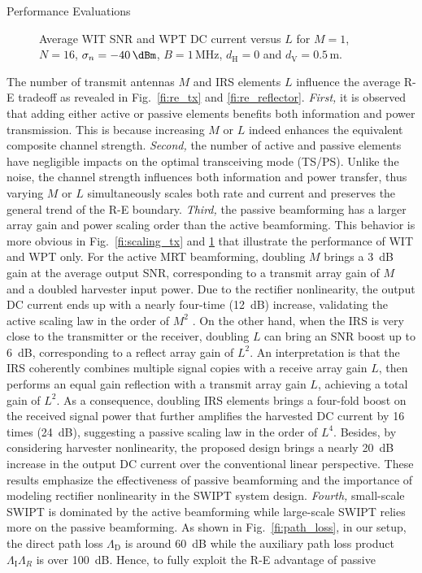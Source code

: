 \documentclass[journal]{IEEEtran}
\begin{document}
\begin{section}{Performance Evaluations}
		\begin{figure}[!t]
			\centering
			\begin{adjustbox}{width=0.9\columnwidth}
				
			\end{adjustbox}
			\caption{Average WIT SNR and WPT DC current versus $L$ for $M=1$, $N=16$, $\sigma_n=-40\,\si{\dBm}$, $B=1\,\si{\MHz}$, $d_{\mathrm{H}}=0$ and $d_{\mathrm{V}}=0.5\,\si{\meter}$.}
			\label{fi:scaling_reflector}
		\end{figure}

		The number of transmit antennas $M$ and IRS elements $L$ influence the average R-E tradeoff as revealed in Fig.~\ref{fi:re_tx} and \ref{fi:re_reflector}. \textit{First,} it is observed that adding either active or passive elements benefits both information and power transmission. This is because increasing $M$ or $L$ indeed enhances the equivalent composite channel strength. \textit{Second,} the number of active and passive elements have negligible impacts on the optimal transceiving mode (TS/PS). Unlike the noise, the channel strength influences both information and power transfer, thus varying $M$ or $L$ simultaneously scales both rate and current and preserves the general trend of the R-E boundary. \textit{Third,} the passive beamforming has a larger array gain and power scaling order than the active beamforming. This behavior is more obvious in Fig.~\ref{fi:scaling_tx} and \ref{fi:scaling_reflector} that illustrate the performance of WIT and WPT only. For the active MRT beamforming, doubling $M$ brings a \SI{3}{\dB} gain at the average output SNR, corresponding to a transmit array gain of $M$ and a doubled harvester input power. Due to the rectifier nonlinearity, the output DC current ends up with a nearly four-time (\SI{12}{\dB}) increase, validating the active scaling law in the order of $M^2$ \cite{Clerckx2016a}. On the other hand, when the IRS is very close to the transmitter or the receiver, doubling $L$ can bring an SNR boost up to \SI{6}{\dB}, corresponding to a reflect array gain of $L^2$. An interpretation is that the IRS coherently combines multiple signal copies with a receive array gain $L$, then performs an equal gain reflection with a transmit array gain $L$, achieving a total gain of $L^2$. As a consequence, doubling IRS elements brings a four-fold boost on the received signal power that further amplifies the harvested DC current by \num{16} times (\SI{24}{\dB}), suggesting a passive scaling law in the order of $L^4$. Besides, by considering harvester nonlinearity, the proposed design brings a nearly \SI{20}{\dB} increase in the output DC current over the conventional linear perspective. These results emphasize the effectiveness of passive beamforming and the importance of modeling rectifier nonlinearity in the SWIPT system design. \textit{Fourth,} small-scale SWIPT is dominated by the active beamforming while large-scale SWIPT relies more on the passive beamforming. As shown in Fig.~\ref{fi:path_loss}, in our setup, the direct path loss $\Lambda_\mathrm{D}$ is around \SI{60}{\dB} while the auxiliary path loss product $\Lambda_{\mathrm{I}}\Lambda_R$ is over \SI{100}{\dB}. Hence, to fully exploit the R-E advantage of passive 
\end{section}
\end{document}
